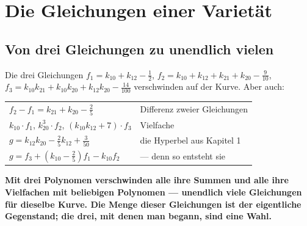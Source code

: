 \chapter{Die Gleichungen einer Varietät}

\section{Von drei Gleichungen zu unendlich vielen}

\begin{merksatz}
Die drei Gleichungen $f_1 = k_{10} + k_{12} - \tfrac12$, $f_2 = k_{10} + k_{12} + k_{21} + k_{20} - \tfrac{9}{10}$, $f_3 = k_{10}k_{21} + k_{10}k_{20} + k_{12}k_{20} - \tfrac{14}{100}$ verschwinden auf der Kurve. Aber auch:
\begin{center}
{\small
\renewcommand{\arraystretch}{1.5}
\begin{tabular}{@{}P{4.6cm}P{4.0cm}@{}}
\toprule
$f_2 - f_1 = k_{21} + k_{20} - \tfrac25$ & Differenz zweier Gleichungen\\
$k_{10}\cdot f_1$, $k_{20}^{3}\cdot f_2$, $(k_{10}k_{12} + 7)\cdot f_3$ & Vielfache\\
$g = k_{12}k_{20} - \tfrac25k_{12} + \tfrac{3}{50}$ & die Hyperbel aus Kapitel 1\\
$g = f_3 + (k_{10} - \tfrac25)f_1 - k_{10}f_2$ & --- denn so entsteht sie\\
\bottomrule
\end{tabular}}
\end{center}

\begin{center}
\begin{minipage}{0.9\textwidth}
\textbf{Mit drei Polynomen verschwinden alle ihre Summen und alle ihre Vielfachen mit beliebigen Polynomen --- unendlich viele Gleichungen für dieselbe Kurve. Die Menge dieser Gleichungen ist der eigentliche Gegenstand; die drei, mit denen man begann, sind eine Wahl.}
\end{minipage}
\end{center}

\begin{center}
\begin{minipage}{0.88\textwidth}
\end{minipage}
\end{center}
\end{merksatz}

